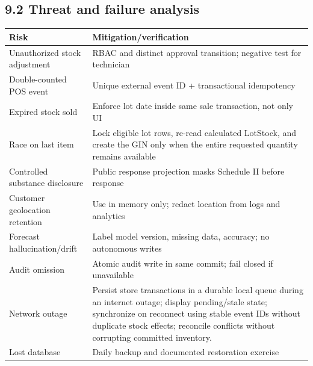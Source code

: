 \subsection{9.2 Threat and failure analysis}\label{threat-and-failure-analysis}

{\def\LTcaptype{none} %
\begin{longtable}[]{|
  >{\raggedright\arraybackslash}m{}|
  >{\raggedright\arraybackslash}m{}|}
\hline
\begin{minipage}[c]{\linewidth}\raggedright
\textbf{Risk}
\end{minipage} & \begin{minipage}[c]{\linewidth}\raggedright
\textbf{Mitigation/verification}
\end{minipage} \\
\hline
\endhead

\endlastfoot
Unauthorized stock adjustment & RBAC and distinct approval transition; negative test for technician \\ \hline
Double-counted POS event & Unique external event ID + transactional idempotency \\ \hline
Expired stock sold & Enforce lot date inside same sale transaction, not only UI \\ \hline
Race on last item & Lock eligible lot rows, re-read calculated LotStock, and create the GIN only when the entire requested quantity remains available \\ \hline
Controlled substance disclosure & Public response projection masks Schedule II before response \\ \hline
Customer geolocation retention & Use in memory only; redact location from logs and analytics \\ \hline
Forecast hallucination/drift & Label model version, missing data, accuracy; no autonomous writes \\ \hline
Audit omission & Atomic audit write in same commit; fail closed if unavailable \\ \hline
Network outage & Persist store transactions in a durable local queue during an internet outage; display pending/stale state; synchronize on reconnect using stable event IDs without duplicate stock effects; reconcile conflicts without corrupting committed inventory. \\ \hline
Lost database & Daily backup and documented restoration exercise \\ \hline
\end{longtable}
}

